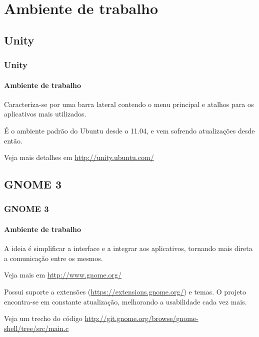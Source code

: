 \section{Ambiente de trabalho}

\begin{frame}


\end{frame}


\subsection{Unity}

\begin{frame}


\end{frame}

\begin{frame}\frametitle{Unity}\framesubtitle{Ambiente de trabalho}

Caracteriza-se por uma barra lateral contendo o menu principal e atalhos para os aplicativos
mais utilizados.

\medskip

É o ambiente padrão do Ubuntu desde o 11.04, e vem sofrendo atualizações desde então.

\medskip

Veja mais detalhes em \url{http://unity.ubuntu.com/}

\end{frame}

\subsection{GNOME 3}

\begin{frame}


\end{frame}

\begin{frame}\frametitle{GNOME 3}\framesubtitle{Ambiente de trabalho}

A ideia é simplificar a interface e a integrar aos aplicativos, tornando mais direta
a comunicação entre os mesmos.

\medskip

Veja mais em \url{http://www.gnome.org/}

\medskip

Possui suporte a extensões (\url{https://extensions.gnome.org/}) e temas.
O projeto encontra-se em constante atualização, melhorando a usabilidade cada vez mais.

\medskip

Veja um trecho do código \url{http://git.gnome.org/browse/gnome-shell/tree/src/main.c}

\end{frame}

